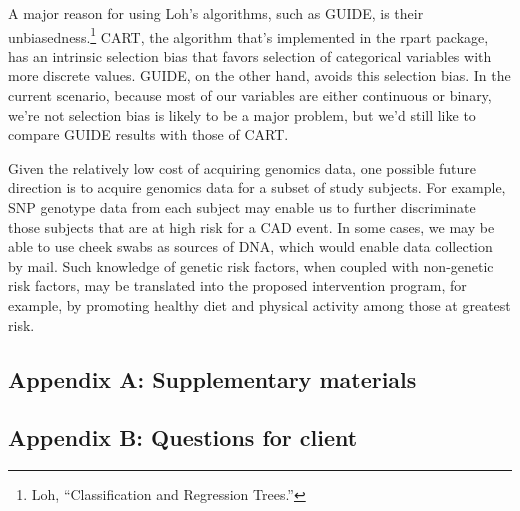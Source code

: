\documentclass[11pt,]{article}
\let\rmarkdownfootnote\footnote%
\def\footnote{\protect\rmarkdownfootnote}
\begin{document}

A major reason for using Loh's algorithms, such as GUIDE, is their
unbiasedness.\footnote{Loh, ``Classification and Regression Trees.'' }
CART, the algorithm that's implemented in the rpart package, has an
intrinsic selection bias that favors selection of categorical variables
with more discrete values. GUIDE, on the other hand, avoids this
selection bias. In the current scenario, because most of our variables
are either continuous or binary, we're not selection bias is likely to
be a major problem, but we'd still like to compare GUIDE results with
those of CART.

Given the relatively low cost of acquiring genomics data, one possible
future direction is to acquire genomics data for a subset of study
subjects. For example, SNP genotype data from each subject may enable us
to further discriminate those subjects that are at high risk for a CAD
event. In some cases, we may be able to use cheek swabs as sources of
DNA, which would enable data collection by mail. Such knowledge of
genetic risk factors, when coupled with non-genetic risk factors, may be
translated into the proposed intervention program, for example, by
promoting healthy diet and physical activity among those at greatest
risk.

\newpage

\subsection{Appendix A: Supplementary
materials}\label{appendix-a-supplementary-materials}

\newpage 

\subsection{Appendix B: Questions for
client}\label{appendix-b-questions-for-client}
\end{document}
